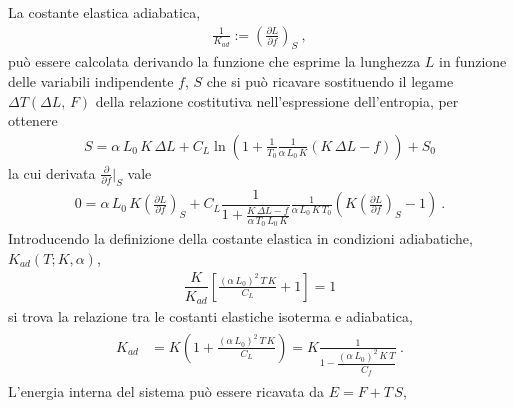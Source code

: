 \documentclass[letterpaper,10pt,italian]{jupyterBook}
\begin{document}
\sphinxAtStartPar
La costante elastica adiabatica,
\begin{equation*}
\begin{split}\frac{1}{K_{ad}} := \left(\frac{\partial L}{\partial f}\right)_S \ ,\end{split}
\end{equation*}
\sphinxAtStartPar
può essere calcolata derivando la funzione che esprime la lunghezza \(L\) in funzione delle variabili indipendente \(f\), \(S\) che si può ricavare sostituendo il legame \(\Delta T(\Delta L, \, F)\) della relazione costitutiva nell’espressione dell’entropia, per ottenere
\begin{equation*}
\begin{split}S = \alpha \, L_0 \, K \, \Delta L + C_L \ln \left( 1 + \frac{1}{T_0} \frac{1}{\alpha \, L_0 \, K} \left( K \, \Delta L - f \right) \right) + S_0\end{split}
\end{equation*}
\sphinxAtStartPar
la cui derivata \(\frac{\partial}{\partial f}\big|_S\) vale
\begin{equation*}
\begin{split}0 = \alpha \, L_0 \, K \left(\frac{\partial L}{\partial f}\right)_S + C_L \dfrac{1}{1 + \frac{K \, \Delta L - f}{\alpha \, T_0 \, L_0 \, K}}\frac{1}{\alpha \, L_0 \, K \, T_0} \left( K \left(\frac{\partial L}{\partial f}\right)_S - 1\right) \ .\end{split}
\end{equation*}
\sphinxAtStartPar
Introducendo la definizione della costante elastica in condizioni adiabatiche, \(K_{ad}(T; K, \alpha)\),
\begin{equation*}
\begin{split}\dfrac{K}{K_{ad}} \left[ \frac{(\alpha \, L_0)^2 \, T \, K }{C_L} + 1 \right] = 1\end{split}
\end{equation*}
\sphinxAtStartPar
si trova la relazione tra le costanti elastiche isoterma e adiabatica,
\begin{equation*}
\begin{split}\begin{aligned}
  K_{ad} & = K \left( 1 + \frac{(\alpha \, L_0)^2 \, T \, K }{C_L} \right)     
           = K \frac{1}{1 - \dfrac{(\alpha \, L_0)^2 \, K \, T }{C_f}} \ . 
\end{aligned}\end{split}
\end{equation*}
\sphinxAtStartPar
{}
L’energia interna del sistema può essere ricavata da \(E = F + T \, S\),
\end{document}
